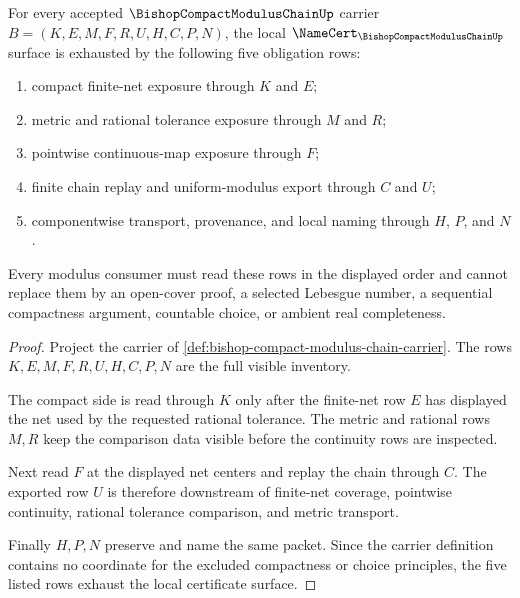 \begin{theorem}
\label{thm:bishop-compact-modulus-chain-namecert-obligations}
For every accepted $\BishopCompactModulusChainUp$ carrier $B=(K,E,M,F,R,U,H,C,P,N)$, the local $\NameCert_{\BishopCompactModulusChainUp}$ surface is exhausted by the following five obligation rows:
\begin{enumerate}
\item compact finite-net exposure through $K$ and $E$;
\item metric and rational tolerance exposure through $M$ and $R$;
\item pointwise continuous-map exposure through $F$;
\item finite chain replay and uniform-modulus export through $C$ and $U$;
\item componentwise transport, provenance, and local naming through $H$, $P$, and $N$.
\end{enumerate}
Every modulus consumer must read these rows in the displayed order and cannot replace them by an open-cover proof, a selected Lebesgue number, a sequential compactness argument, countable choice, or ambient real completeness.
\end{theorem}
\begin{proof}
Project the carrier of \autoref{def:bishop-compact-modulus-chain-carrier}. The rows $K,E,M,F,R,U,H,C,P,N$ are the full visible inventory.

The compact side is read through $K$ only after the finite-net row $E$ has displayed the net used by the requested rational tolerance. The metric and rational rows $M,R$ keep the comparison data visible before the continuity rows are inspected.

Next read $F$ at the displayed net centers and replay the chain through $C$. The exported row $U$ is therefore downstream of finite-net coverage, pointwise continuity, rational tolerance comparison, and metric transport.

Finally $H,P,N$ preserve and name the same packet. Since the carrier definition contains no coordinate for the excluded compactness or choice principles, the five listed rows exhaust the local certificate surface.
\end{proof}


